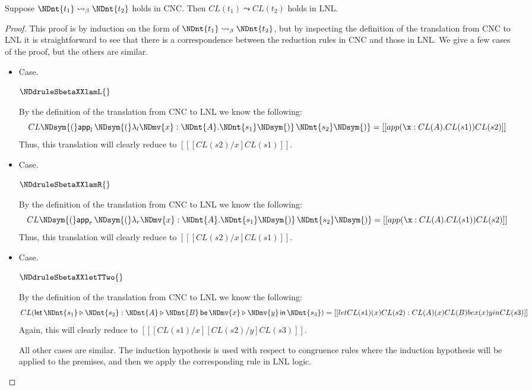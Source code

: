 \begin{lemma}
  Suppose $\NDnt{t_{{\mathrm{1}}}}  \leadsto_\beta  \NDnt{t_{{\mathrm{2}}}}$ holds in CNC. Then $CL(t_1)\leadsto CL(t_2)$ holds
  in LNL.
\end{lemma}
\begin{proof}
  This proof is by induction on the form of $\NDnt{t_{{\mathrm{1}}}}  \leadsto_\beta  \NDnt{t_{{\mathrm{2}}}}$, but by
  inspecting the definition of the translation from CNC to LNL it is
  straightforward to see that there is a correspondence between the
  reduction rules in CNC and those in LNL.  We give a few cases of the
  proof, but the others are similar.

  \begin{itemize}
  \item[] Case.
    \begin{center}
      $\NDdruleSbetaXXlamL{}$
    \end{center}
    By the definition of the translation from CNC to LNL we know the following:
    \[
    CL\NDsym{(}   \mathsf{app}_l\, \NDsym{(}   \lambda_l  \NDmv{x}  :  \NDnt{A} . \NDnt{s_{{\mathrm{1}}}}   \NDsym{)} \, \NDnt{s_{{\mathrm{2}}}}   \NDsym{)} = [[app (\x:CL(A).CL(s1)) CL(s2)]]\\
    \]
    Thus, this translation will clearly reduce to $[[ [CL(s2)/x]CL(s1)]]$.

  \item[] Case.
    \begin{center}
      $\NDdruleSbetaXXlamR{}$
    \end{center}
    By the definition of the translation from CNC to LNL we know the following:
    \[
    CL\NDsym{(}   \mathsf{app}_r\, \NDsym{(}   \lambda_r  \NDmv{x}  :  \NDnt{A} . \NDnt{s_{{\mathrm{1}}}}   \NDsym{)} \, \NDnt{s_{{\mathrm{2}}}}   \NDsym{)} = [[app (\x:CL(A).CL(s1)) CL(s2)]]\\
    \]
    Thus, this translation will clearly reduce to $[[ [CL(s2)/x]CL(s1)]]$.

  \item[] Case.
    \begin{center}
      $\NDdruleSbetaXXletTTwo{}$
    \end{center}
    By the definition of the translation from CNC to LNL we know the following:
    \[
    CL( \mathsf{let}\, \NDnt{s_{{\mathrm{1}}}}  \triangleright  \NDnt{s_{{\mathrm{2}}}}  :  \NDnt{A}  \triangleright  \NDnt{B} \,\mathsf{be}\, \NDmv{x}  \triangleright  \NDmv{y} \,\mathsf{in}\, \NDnt{s_{{\mathrm{3}}}} ) = [[let CL(s1) (x) CL(s2) : CL(A) (x) CL(B) be x (x) y in CL(s3)]]\\
    \]
    Again, this will clearly reduce to $[[ [CL(s1)/x][CL(s2)/y]CL(s3) ]]$.

    All other cases are similar.  The induction hypothesis is used
    with respect to congruence rules where the induction hypothesis
    will be applied to the premises, and then we apply the
    corresponding rule in LNL logic.
  \end{itemize}
\end{proof}



















